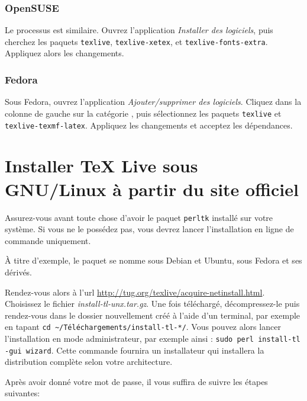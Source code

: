 \subsubsection{OpenSUSE}

Le processus est similaire. Ouvrez l'application \emph{Installer des logiciels}, puis cherchez les paquets \verb|texlive|, \verb|texlive-xetex|, et \verb|texlive-fonts-extra|. Appliquez alors les changements.

\subsubsection{Fedora}

Sous Fedora, ouvrez l'application \emph{Ajouter/supprimer des logiciels}. Cliquez dans la colonne de gauche sur la catégorie , puis sélectionnez les paquets \verb|texlive| et \verb|texlive-texmf-latex|. Appliquez les changements et acceptez les dépendances.

\section{Installer TeX Live sous GNU/Linux à partir du site officiel}

Assurez-vous avant toute chose d'avoir le paquet \verb|perltk| installé sur votre système. Si vous ne le possédez pas, vous devrez lancer l'installation en ligne de commande uniquement.

À titre d'exemple, le paquet se nomme  sous Debian et Ubuntu,  sous Fedora et ses dérivés.

Rendez-vous alors à l'url \url{http://tug.org/texlive/acquire-netinstall.html}. Choisissez  le fichier \emph{install-tl-unx.tar.gz}. Une fois téléchargé, décompressez-le puis rendez-vous dans le dossier nouvellement créé à l'aide d'un terminal, par exemple en tapant \verb|cd ~/Téléchargements/install-tl-*/|. Vous pouvez alors lancer l'installation en mode administrateur, par exemple ainsi : \verb|sudo perl install-tl -gui wizard|. Cette commande fournira un installateur qui installera la distribution complète selon votre architecture.

Après avoir donné votre mot de passe, il vous suffira de suivre les étapes suivantes:

